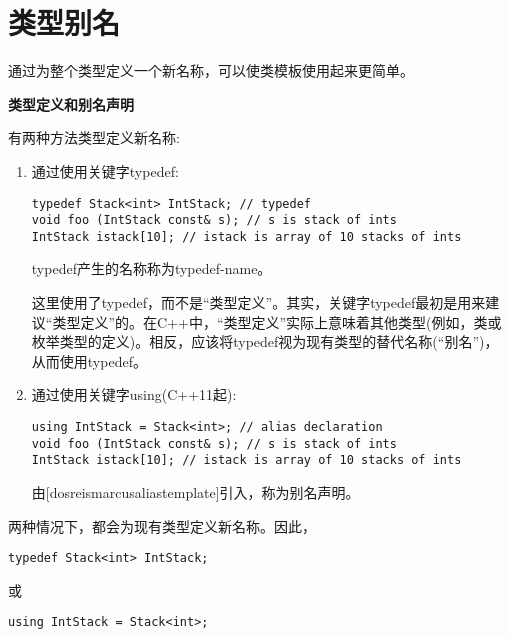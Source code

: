 \section{类型别名}

通过为整个类型定义一个新名称，可以使类模板使用起来更简单。

\noindent
\textbf{类型定义和别名声明}

有两种方法类型定义新名称:

\begin{enumerate}
\item
通过使用关键字typedef:

\begin{lstlisting}[style=styleCXX]
typedef Stack<int> IntStack; // typedef
void foo (IntStack const& s); // s is stack of ints
IntStack istack[10]; // istack is array of 10 stacks of ints
\end{lstlisting}

typedef产生的名称称为typedef-name。

\begin{tcolorbox}[colback=webgreen!5!white,colframe=webgreen!75!black]
\hspace*{0.75cm}这里使用了typedef，而不是“类型定义”。其实，关键字typedef最初是用来建议“类型定义”的。在C++中，“类型定义”实际上意味着其他类型(例如，类或枚举类型的定义)。相反，应该将typedef视为现有类型的替代名称(“别名”)，从而使用typedef。
\end{tcolorbox}

\item
通过使用关键字using(C++11起):

\begin{lstlisting}[style=styleCXX]
using IntStack = Stack<int>; // alias declaration
void foo (IntStack const& s); // s is stack of ints
IntStack istack[10]; // istack is array of 10 stacks of ints
\end{lstlisting}

由[dosreismarcusaliastemplate]引入，称为别名声明。

\end{enumerate}

两种情况下，都会为现有类型定义新名称。因此，

\begin{lstlisting}[style=styleCXX]
typedef Stack<int> IntStack;
\end{lstlisting}

或

\begin{lstlisting}[style=styleCXX]
using IntStack = Stack<int>;
\end{lstlisting}


